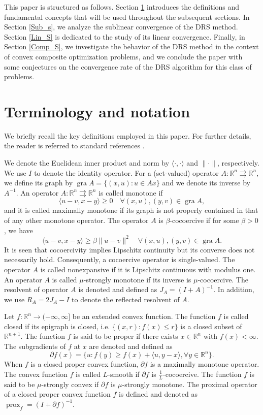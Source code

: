 \documentclass[ijoc,sglanonrev]{informs4}
\begin{document}
This paper is structured as follows. Section \ref{sec:preliminaries} introduces the definitions and fundamental concepts that will be used throughout the subsequent sections. In Section \ref{Sub_s}, we analyze the sublinear convergence of the DRS method. Section \ref{Lin_S} is dedicated to the study of its linear convergence. Finally, in Section \ref{Comp_S}, we investigate the behavior of the DRS method in the context of convex composite optimization problems, and we conclude the paper with some conjectures on the convergence rate
of the DRS algorithm for this class of problems.


\section{Terminology and notation} \label{sec:preliminaries}
We briefly recall the key definitions employed in this paper. For further details, the reader is referred to standard references  \cite{bauschke2017,ryu2022large}. 

We denote the Euclidean inner product and  norm by $\langle \cdot , \cdot \rangle$ and $\|\cdot\|$, respectively. We use $I$ to denote the identity operator. 
For a (set-valued) operator $A : \mathbb{R}^n \rightrightarrows \mathbb{R}^n$, we define  its graph by $\operatorname{gra} A=\{(x,u): u\in Ax\}$ and we denote its inverse by $A^{-1}$.
An operator $A : \mathbb{R}^n \rightrightarrows \mathbb{R}^n$ is called monotone if 
\[
\langle u-v, x-y \rangle \geq 0 \quad \forall (x,u), (y,v) \in \operatorname{gra}A,
\]
and it is called maximally monotone if its graph is not properly contained in that of any other monotone operator.  The operator $A$ is $\beta$-cocoercive if for some $\beta>0$, we have
\[
\langle u-v, x-y \rangle \geq \beta\|u-v\|^2 \quad \forall (x,u), (y,v) \in \operatorname{gra}A.
\]
It is seen that cocoercivity implies Lipschitz continuity but its converse does not necessarily hold. Consequently,  a cocoercive operator is single-valued. The operator $A$ is called nonexpansive if it is Lipschitz continuous with modulus one.  An operator $A$ is called $\mu$-strongly monotone if its inverse is $\mu$-cocoercive. 
The resolvent of operator $A$ is denoted and defined as $J_{A}= (I + A)^{-1}$. In addition, we use $R_A=2J_A-I$ to denote the reflected resolvent of $A$.

  Let $f:\mathbb{R}^n\to(-\infty, \infty]$ be an extended convex function.
The function $f$ is called closed if its epigraph is closed,
i.e. $\{(x, r): f(x)\leq r\}$ is a closed subset of $\mathbb{R}^{n+1}$. The function $f$ is said to be proper if there exists $x\in\mathbb{R}^n$ with $f(x)<\infty$. The subgradients of $f$ at $x$ are denoted and defined as
$$
\partial f(x)=\{u: f(y)\geq f(x)+\langle u, y-x\rangle, \forall y\in\mathbb{R}^n\}.
$$
When $f$ is a closed proper convex function, $\partial f$ is  a  maximally monotone operator. 
The convex function $f$ is called $L$-smooth if $\partial f$ is $\tfrac{1}{L}$-cocoercive. The function $f$ is said to be $\mu$-strongly convex if $\partial f$ is $\mu$-strongly monotone. The proximal operator of a closed proper convex function $f$ is defined and denoted as $\operatorname{prox}_{f}=(I+\partial f)^{-1}$.
\end{document}
